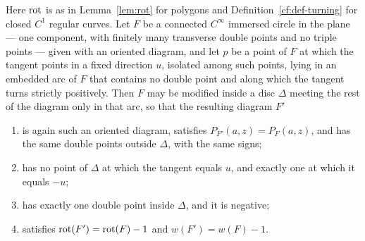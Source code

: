 \begin{lemma}\label{cf:lem-curl}
Here $\operatorname{rot}$ is as in Lemma~\ref{lem:rot} for polygons and
Definition~\ref{cf:def-turning} for closed $C^1$ regular curves.
Let $F$ be a connected $C^\infty$ immersed circle in the plane --- one
component, with finitely many transverse double points and no triple points ---
given with an oriented diagram, and let $p$ be a point of $F$ at which the
tangent points in a fixed direction $u$, isolated among such points, lying in
an embedded arc of $F$ that contains no double point and along which the tangent
turns strictly positively. Then $F$ may be modified inside a disc $\Delta$
meeting the rest of the diagram only in that arc, so that the resulting
diagram $F'$
\begin{enumerate}
\item[(i)] is again such an oriented diagram, satisfies
$P_{F'}(a,z)=P_F(a,z)$, and has the same double points outside $\Delta$, with
the same signs;
\item[(ii)] has no point of $\Delta$ at which the tangent equals $u$, and exactly
one at which it equals $-u$;
\item[(iii)] has exactly one double point inside $\Delta$, and it is negative;
\item[(iv)] satisfies $\operatorname{rot}(F')=\operatorname{rot}(F)-1$ and $w(F')=w(F)-1$.
\end{enumerate}
\end{lemma}
